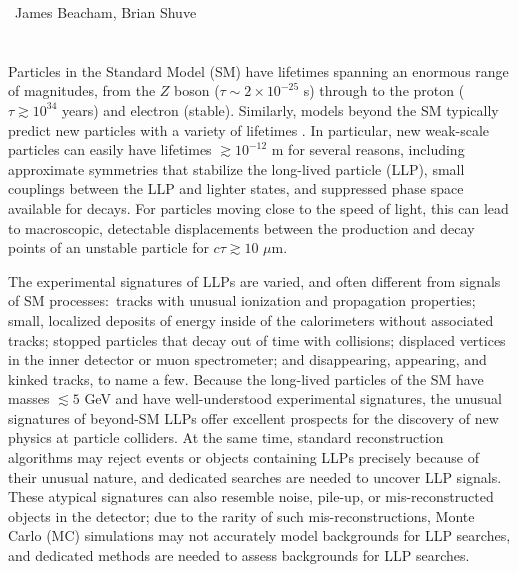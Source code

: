 ~James Beacham, Brian Shuve \\
\text{ \; }\\
\text{ \; }\\

\noindent Particles in the Standard Model (SM) have lifetimes spanning an enormous range of magnitudes, from the $Z$ boson ($\tau\sim2\times10^{-25}$ s) through to the proton ($\tau\gtrsim10^{34}$ years) and electron (stable). Similarly, models beyond the SM typically predict new particles with a variety of lifetimes \cite{massive-cite-dump}. In particular, new weak-scale particles can easily have lifetimes $\gtrsim10^{-12}$ m for several reasons, including approximate symmetries that stabilize the long-lived particle (LLP), small couplings between the LLP and lighter states, and suppressed phase space available for decays. For particles moving close to the speed of light, this can lead to macroscopic, detectable displacements between the production and decay points of an unstable particle for $c\tau\gtrsim 10\,\,\mu\mathrm{m}$.

The experimental signatures of LLPs are varied, and often different from signals of SM processes:~tracks with unusual ionization and propagation properties; small, localized deposits of energy inside of the calorimeters without associated tracks; stopped particles that decay out of time with collisions; displaced vertices in the inner detector or muon spectrometer; and disappearing, appearing, and kinked tracks, to name a few. Because the long-lived particles of the SM have masses $\lesssim5$ GeV and have well-understood experimental signatures, the unusual signatures of beyond-SM LLPs offer excellent prospects for the discovery of new physics at particle colliders. At the same time, standard reconstruction algorithms may reject events or objects containing LLPs precisely because of their unusual nature, and dedicated searches are needed to uncover LLP signals. These atypical signatures can also resemble noise, pile-up, or mis-reconstructed objects in the detector; due to the rarity of such mis-reconstructions, Monte Carlo (MC) simulations may not accurately model backgrounds for LLP searches, and dedicated methods are needed to assess backgrounds for LLP searches.

